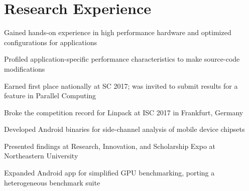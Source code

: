 \documentclass[]{resume-style}
\begin{document}
\vspace{-0.7mm}
\section{\hfill Research Experience \hfill}

\vspace{0.138mm}
\vspace{1.25mm}
\begin{tightemize}
\item Gained hands-on experience in high performance hardware and optimized configurations for applications
\item Profiled application-specific performance characteristics to make source-code modifications
\item Earned first place nationally at SC 2017; was invited to submit results for a feature in Parallel Computing
\item Broke the competition record for Linpack at ISC 2017 in Frankfurt, Germany
\end{tightemize}

\vspace{2mm}
\vspace{0.1mm}
\vspace{1.3mm}
\begin{tightemize}
\item Developed Android binaries for side-channel analysis of mobile device chipsets
\item Presented findings at Research, Innovation, and Scholarship Expo at Northeastern University
\item Expanded Android app for simplified GPU benchmarking, porting a heterogeneous benchmark suite
\end{tightemize}

\vspace{-1mm}
\end{document}
